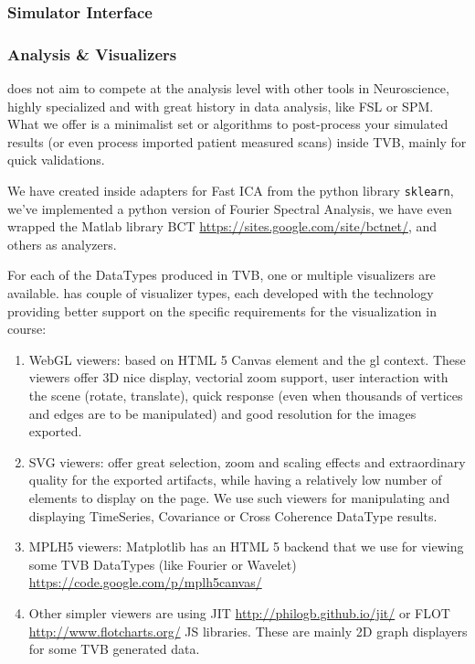 	\subsubsection{Simulator Interface}
	
	\subsubsection{Analysis \& Visualizers}

\TVB does not aim to compete at the analysis level with other tools in Neuroscience, 
highly specialized and with great history in data analysis, like  FSL or SPM. 
What we offer is a minimalist set or algorithms to post-process your 
simulated results (or even process imported patient measured scans) inside TVB, mainly for quick validations.

We have created inside \TVB adapters for Fast ICA from the python library \texttt{sklearn}, 
we've implemented a python version of Fourier Spectral Analysis, 
we have even wrapped the Matlab library BCT \url{https://sites.google.com/site/bctnet/}, and others as analyzers.

For each of the DataTypes produced in TVB, one or multiple visualizers are available.	
\TVB has couple of  visualizer types, each developed with the technology providing better support on the specific requirements for the visualization in course:

\begin{enumerate}

	\item WebGL viewers: based on HTML 5 Canvas element and the gl context. 
	These viewers offer 3D nice display, vectorial zoom support, user interaction with the scene (rotate, translate), quick response 
	(even when thousands of vertices and edges are to be manipulated) and good resolution for the images exported.
	
	\item SVG viewers: offer great selection, zoom and scaling effects and extraordinary quality for the exported artifacts, while having 
	a relatively low number of elements to display on the page. 
	We use such viewers for manipulating and displaying TimeSeries, Covariance or Cross Coherence DataType results.
	
	\item MPLH5 viewers: Matplotlib has an HTML 5 backend that we use for viewing some TVB DataTypes (like Fourier or Wavelet)
	\url{https://code.google.com/p/mplh5canvas/}
	
	\item Other simpler viewers are using JIT \url{http://philogb.github.io/jit/} or FLOT \url{http://www.flotcharts.org/} JS libraries.
	These are mainly 2D graph displayers for some TVB generated data.

\end{enumerate}


